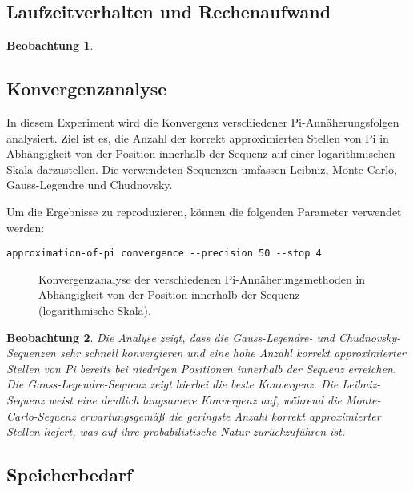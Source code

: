 \documentclass{scrartcl}
\newtheorem{approximation sequence}{Annäherungsfolge}
\newtheorem{observation}{Beobachtung}
\begin{document}
\subsection{Laufzeitverhalten und Rechenaufwand}

\begin{observation}

\end{observation}

\subsection{Konvergenzanalyse}

In diesem Experiment wird die Konvergenz verschiedener Pi-Annäherungsfolgen
analysiert. Ziel ist es, die Anzahl der korrekt approximierten Stellen von Pi
in Abhängigkeit von der Position innerhalb der Sequenz auf einer
logarithmischen Skala darzustellen. Die verwendeten Sequenzen umfassen Leibniz,
Monte Carlo, Gauss-Legendre und Chudnovsky.

Um die Ergebnisse zu reproduzieren, können die folgenden Parameter verwendet
werden:
\begin{verbatim}
approximation-of-pi convergence --precision 50 --stop 4
\end{verbatim}

\begin{figure}[H]
    \centering
    
    \caption{Konvergenzanalyse der verschiedenen Pi-Annäherungsmethoden in Abhängigkeit von der Position innerhalb der Sequenz (logarithmische Skala).}
    \label{fig:convergence-analysis}
\end{figure}

\begin{observation}
    Die Analyse zeigt, dass die Gauss-Legendre- und Chudnovsky-Sequenzen sehr
    schnell konvergieren und eine hohe Anzahl korrekt approximierter Stellen von Pi
    bereits bei niedrigen Positionen innerhalb der Sequenz erreichen.
    Die Gauss-Legendre-Sequenz zeigt hierbei die beste Konvergenz.
    Die Leibniz-Sequenz weist eine deutlich langsamere Konvergenz auf, während die
    Monte-Carlo-Sequenz erwartungsgemäß die geringste Anzahl korrekt approximierter
    Stellen liefert, was auf ihre probabilistische Natur zurückzuführen ist.
\end{observation}

\subsection{Speicherbedarf}
\end{document}
